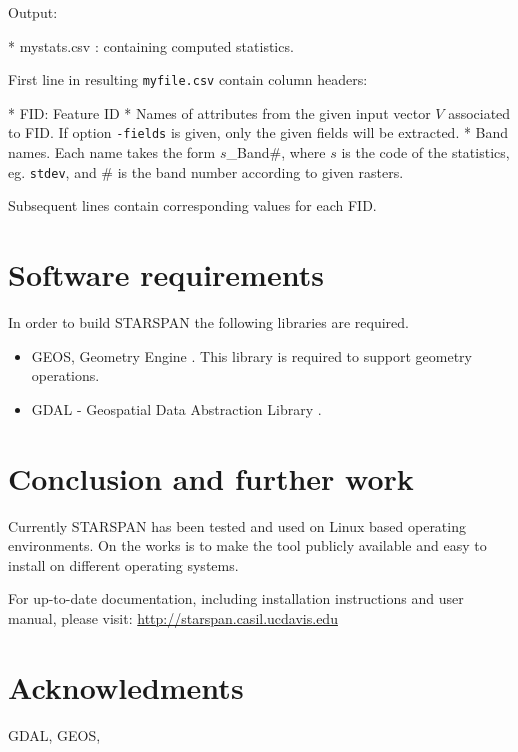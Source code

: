 \documentclass{elsart}
\newcommand{\starspan}{STARSPAN{}}
\begin{document}
Output:

    * mystats.csv : containing computed statistics.

First line in resulting \verb|myfile.csv| contain column headers:

    * FID: Feature ID
    * Names of attributes from the given input vector $V$ associated to FID. 
	If option \verb|-fields| is given, only the given fields will be extracted.
    * Band names. Each name takes the form $s$\_Band\#, where $s$
	is the code of the statistics, eg. \verb|stdev|, and \# is the band number 
	according to given rasters.

Subsequent lines contain corresponding values for each FID.

\section{Software requirements}

	In order to build \starspan{} the following libraries are required.
	
	\begin{itemize}
		\item GEOS, Geometry Engine \citep{geos}.
				This library is required to support geometry operations.
				
		\item GDAL - Geospatial Data Abstraction Library \citep{gdal}.
	\end{itemize}


\section{Conclusion and further work}

	Currently \starspan{} has been tested and used on Linux based operating
	environments. On the works is to make the tool publicly available and easy
	to install on different operating systems.


	For up-to-date documentation, including installation instructions and user
	manual, please visit: \url{http://starspan.casil.ucdavis.edu}

\section*{Acknowledments}

	GDAL, GEOS, 


	
\end{document}

